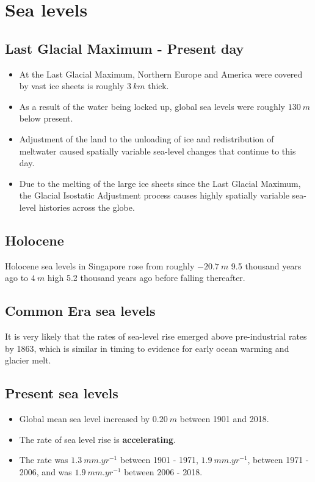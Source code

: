 \documentclass[11pt]{article}
\begin{document}
\newpage

\section{Sea levels}
\label{sec:org3c4de3d}

\subsection{Last Glacial Maximum - Present day}
\label{sec:org5078135}
\begin{itemize}
\item At the Last Glacial Maximum, Northern Europe and America were covered by vast ice sheets is roughly \(\qty{3}{km}\) thick.
\item As a result of the water being locked up, global sea levels were roughly \(\qty{130}{m}\) below present.
\item Adjustment of the land to the unloading of ice and redistribution of meltwater caused spatially variable sea-level changes that continue to this day.
\item Due to the melting of the large ice sheets since the Last Glacial Maximum, the Glacial Isostatic Adjustment process causes highly spatially variable sea-level histories across the globe.
\end{itemize}

\subsection{Holocene}
\label{sec:org81ba675}
Holocene sea levels in Singapore rose from roughly \(\qty{-20.7}{m}\) 9.5 thousand years ago to \(\qty{4}{m}\) high 5.2 thousand years ago before falling thereafter.

\subsection{Common Era sea levels}
\label{sec:org85f96f3}
It is very likely that the rates of sea-level rise emerged above pre-industrial rates by 1863, which is similar in timing to evidence for early ocean warming and glacier melt.

\subsection{Present sea levels}
\label{sec:org5cd5e7d}
\begin{itemize}
\item Global mean sea level increased by \(\qty{0.20}{m}\) between 1901 and 2018.
\item The rate of sea level rise is \textbf{accelerating}.
\item The rate was \(\qty{1.3}{mm.yr^{-1}}\) between 1901 - 1971, \(\qty{1.9}{mm.yr^{-1}}\), between 1971 - 2006, and was \(\qty{1.9}{mm.yr^{-1}}\) between 2006 - 2018.
\end{itemize}
\end{document}

